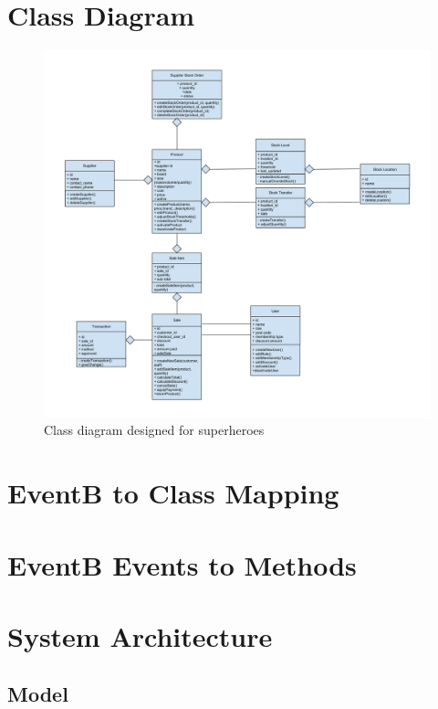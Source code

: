 \documentclass[a4paper]{article}
\begin{document}
\section{Class Diagram}
\begin{figure}[h]
\centering
  \hspace*{-0.3in}
  \includegraphics[scale=0.3]{ClassDiagram.pdf}
	\caption{Class diagram designed for superheroes}
\end{figure}

\pagebreak

\section{EventB to Class Mapping}
\pagebreak

\section{EventB Events to Methods}
\pagebreak

\section{System Architecture}

\subsection{Model}
\end{document}
